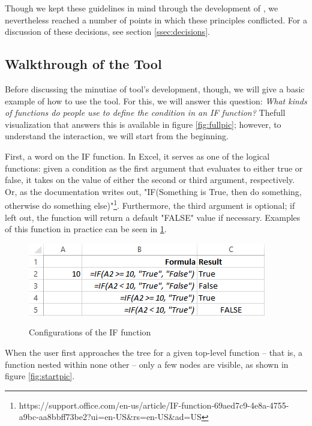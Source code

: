 \documentclass[conference]{IEEEtran}
\begin{document}
	Though we kept these guidelines in mind through the development of \toolname,
	we nevertheless reached a number of points in which these principles
	conflicted. For a discussion of these decisions, see section
	\ref{ssec:decisions}.
	
	\subsection{Walkthrough of the Tool} Before discussing the minutiae of tool's
	development, though, we will give a basic example of how to use the tool. For
	this, we will answer this question: \textit{ What kinds of functions do people
		use to define the condition in an IF function?} Thefull  visualization that
	answers this is available in figure \ref{fig:fullpic}; however, to understand
	the interaction, we will start from the beginning. \par
	
	First, a word on the IF function. In Excel, it serves as one of the logical
	functions: given a condition as the first argument that evaluates to either
	true or false, it takes on the value of either the second or third argument,
	respectively. Or, as the documentation writes out, "IF(Something is True, then
	do something, otherwise do something
	else)"\footnote{https://support.office.com/en-us/article/IF-function-69aed7c9-4e8a-4755-a9bc-aa8bbff73be2?ui=en-US\&rs=en-US\&ad=US}. Furthermore, the third argument is optional; if left out, the function will return a default "FALSE" value if necessary. Examples of this function in practice can be seen in \ref{fig:ifexample}.
	
	\begin{figure}[h] \centering \includegraphics[width=.5\textwidth]{ifExample}
		\label{fig:ifexample} \caption{Configurations of the IF function} \end{figure}
	
	When the user first approaches the tree for a given top-level function -- that
	is, a function nested within none other -- only a few nodes are visible, as
	shown in figure \ref{fig:startpic}. \par
	
\end{document}
